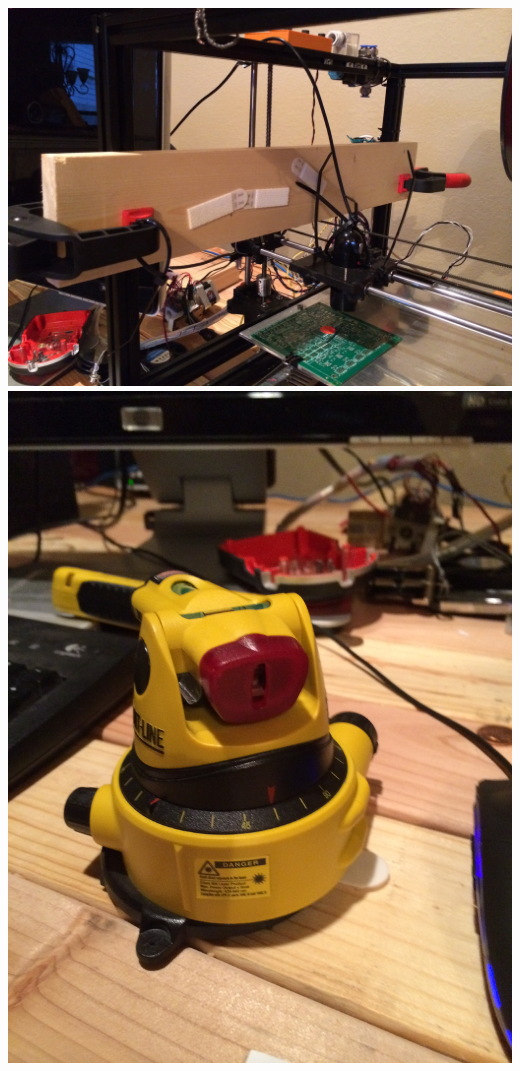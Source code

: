 \documentclass[12pt]{article}
\begin{document}
\includegraphics[scale=0.1,angle=270]{images/volume_analysis_setup/IMG_0614.JPG}
\includegraphics[scale=0.1,angle=270]{images/volume_analysis_setup/IMG_0616.JPG}
\end{document}
